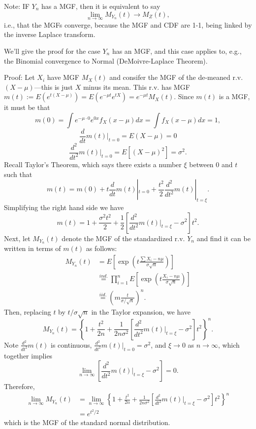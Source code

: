 \documentclass[
]{book}
\begin{document}
Note: IF \(Y_n\) has a MGF, then it is equivalent to say
\[\lim_{n\rightarrow \infty}M_{Y_n}(t) \rightarrow M_Z(t),\]
i.e., that the MGFs converge, because the MGF and CDF are 1-1, being linked by the inverse Laplace transform.

We'll give the proof for the case \(Y_n\) has an MGF, and this case applies to, e.g., the Binomial convergence to Normal (DeMoivre-Laplace Theorem).

Proof:
Let \(X_i\) have MGF \(M_X(t)\) and consifer the MGF of the de-meaned r.v. \((X - \mu)\)---this is just \(X\) minus its mean. This r.v. has MGF \(m(t):=E(e^{t(X-\mu)}) = E(e^{-\mu t}e^{tX}) = e^{-\mu t}M_X(t)\). Since \(m(t)\) is a MGF, it must be that
\[m(0) = \int e^{-\mu \cdot 0}e^{0 x}f_X(x-\mu)dx = \int f_X(x-\mu)dx = 1,\]
\[\frac{d}{dt}m(t)|_{t=0} = E(X-\mu) = 0\]
\[\frac{d^2}{dt^2}m(t)|_{t=0} = E[(X-\mu)^2] = \sigma^2.\]
Recall Taylor's Theorem, which says there exists a number \(\xi\) between \(0\) and \(t\) such that
\[m(t) = m(0) + t \frac{d}{dt}m(t)|_{t=0} + \frac{t^2}{2}\frac{d^2}{dt^2}m(t)|_{t=\xi}.\]
Simplifying the right hand side we have
\[m(t) = 1 + \frac{\sigma^2 t^2}{2} + \frac{1}{2}\left[\frac{d^2}{dt^2}m(t)|_{t=\xi} - \sigma^2\right]t^2.\]
Next, let \(M_{Y_n}(t)\) denote the MGF of the standardized r.v. \(Y_n\) and find it can be written in terms of \(m(t)\) as follows:
\begin{align*}
M_{Y_n}(t) & = E\left[\exp\left(t\frac{\sum X_i - n\mu}{\sigma \sqrt{n}}\right)\right]\\
& \stackrel{ind.}{=}\prod_{i=1}^n E\left[\exp\left(t\frac{X_i - n\mu}{\sigma \sqrt{n}}\right)\right]\\
& \stackrel{iid.}{=}\left(m\frac{t}{\sigma/\sqrt{n}}\right)^n.
\end{align*}
Then, replacing \(t\) by \(t/\sigma\sqrt n\) in the Taylor expansion, we have
\[M_{Y_n}(t) = \left\{1 + \frac{t^2}{2n} + \frac{1}{2n\sigma^2}\left[\frac{d^2}{dt^2}m(t)|_{t=\xi} - \sigma^2\right]t^2\right\}^n.\]
Note \(\frac{d^2}{dt^2}m(t)\) is continuous, \(\frac{d^2}{dt^2}m(t)|_{t=0} = \sigma^2\), and \(\xi \rightarrow 0\) as \(n\rightarrow \infty\), which together implies
\[\lim_{n\rightarrow \infty}\left[\frac{d^2}{dt^2}m(t)|_{t=\xi} - \sigma^2\right] = 0.\]
Therefore,
\begin{align*}
\lim_{n\rightarrow \infty} M_{Y_n}(t) & = \lim_{n\rightarrow \infty}\left\{1 + \frac{t^2}{2n} + \frac{1}{2n\sigma^2}\left[\frac{d^2}{dt^2}m(t)|_{t=\xi} - \sigma^2\right]t^2\right\}^n \\
& = e^{t^2/2}
\end{align*}
which is the MGF of the standard normal distribution.
\end{document}
